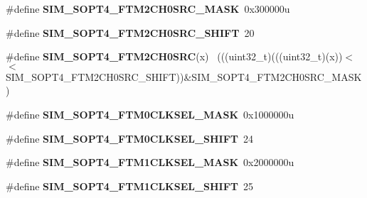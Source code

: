\begin{DoxyCompactItemize}
\item 
\hypertarget{group___s_i_m___register___masks_ga0dcacc22852e0ee0a7a853a51b422b70}{}\#define {\bfseries S\+I\+M\+\_\+\+S\+O\+P\+T4\+\_\+\+F\+T\+M2\+C\+H0\+S\+R\+C\+\_\+\+M\+A\+S\+K}~0x300000u\label{group___s_i_m___register___masks_ga0dcacc22852e0ee0a7a853a51b422b70}

\item 
\hypertarget{group___s_i_m___register___masks_ga04d4aa6612f4d2df7d9e0e85f15f6dd6}{}\#define {\bfseries S\+I\+M\+\_\+\+S\+O\+P\+T4\+\_\+\+F\+T\+M2\+C\+H0\+S\+R\+C\+\_\+\+S\+H\+I\+F\+T}~20\label{group___s_i_m___register___masks_ga04d4aa6612f4d2df7d9e0e85f15f6dd6}

\item 
\hypertarget{group___s_i_m___register___masks_ga05f9da2ddf9e9aa2509b88a964cb91f6}{}\#define {\bfseries S\+I\+M\+\_\+\+S\+O\+P\+T4\+\_\+\+F\+T\+M2\+C\+H0\+S\+R\+C}(x)                                ~(((uint32\+\_\+t)(((uint32\+\_\+t)(x))$<$$<$S\+I\+M\+\_\+\+S\+O\+P\+T4\+\_\+\+F\+T\+M2\+C\+H0\+S\+R\+C\+\_\+\+S\+H\+I\+F\+T))\&S\+I\+M\+\_\+\+S\+O\+P\+T4\+\_\+\+F\+T\+M2\+C\+H0\+S\+R\+C\+\_\+\+M\+A\+S\+K)\label{group___s_i_m___register___masks_ga05f9da2ddf9e9aa2509b88a964cb91f6}

\item 
\hypertarget{group___s_i_m___register___masks_gaac823c598ac790d9eeeeb7ddb86d1657}{}\#define {\bfseries S\+I\+M\+\_\+\+S\+O\+P\+T4\+\_\+\+F\+T\+M0\+C\+L\+K\+S\+E\+L\+\_\+\+M\+A\+S\+K}~0x1000000u\label{group___s_i_m___register___masks_gaac823c598ac790d9eeeeb7ddb86d1657}

\item 
\hypertarget{group___s_i_m___register___masks_ga77c42e9023c3ed2d759431e2c072860f}{}\#define {\bfseries S\+I\+M\+\_\+\+S\+O\+P\+T4\+\_\+\+F\+T\+M0\+C\+L\+K\+S\+E\+L\+\_\+\+S\+H\+I\+F\+T}~24\label{group___s_i_m___register___masks_ga77c42e9023c3ed2d759431e2c072860f}

\item 
\hypertarget{group___s_i_m___register___masks_ga0cd5cb92a9ea79e8227693c793ee5983}{}\#define {\bfseries S\+I\+M\+\_\+\+S\+O\+P\+T4\+\_\+\+F\+T\+M1\+C\+L\+K\+S\+E\+L\+\_\+\+M\+A\+S\+K}~0x2000000u\label{group___s_i_m___register___masks_ga0cd5cb92a9ea79e8227693c793ee5983}

\item 
\hypertarget{group___s_i_m___register___masks_ga04492b54a5b581b3bdef8568bdbabf91}{}\#define {\bfseries S\+I\+M\+\_\+\+S\+O\+P\+T4\+\_\+\+F\+T\+M1\+C\+L\+K\+S\+E\+L\+\_\+\+S\+H\+I\+F\+T}~25\label{group___s_i_m___register___masks_ga04492b54a5b581b3bdef8568bdbabf91}


\end{DoxyCompactItemize}
